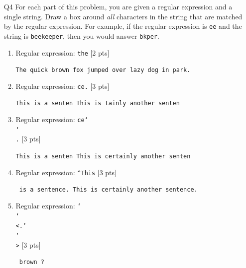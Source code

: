 \documentclass[12pt]{article}
\theoremstyle{Conjecture}
\theoremstyle{example}
\theoremstyle{remark}
\theoremstyle{lemma}
\theoremstyle{definition}
\theoremstyle{corol}
\theoremstyle{proposition}
\theoremstyle{condition}
\begin{document}
\begin{enumerate}
  \newpage

\item [Q4] For each part of this problem, you are given a regular expression and a single string. Draw a box around \emph{all} characters in the string that are matched by the regular expression. For example, if the regular expression is \texttt{ee} and the string is \texttt{beekeeper}, then you would answer \texttt{bkper}. 

\begin{enumerate}
  \item Regular expression: \texttt{\large the} [2 pts]
  \vspace{0.2in}
  \begin{center}
    \texttt{\large The quick brown fox jumped over  lazy dog in  park.}
  \end{center}
  \vspace{0.2in}
  \item Regular expression: \texttt{\large ce.} [3 pts]
  \vspace{0.2in}
  \begin{center}
    \texttt{\large This is a senten This is tainly another senten}
  \end{center}
  \vspace{0.2in}
  \item Regular expression: \texttt{\large ce\char`\\\char`\\.} [3 pts]
  \vspace{0.2in}
  \begin{center}
    \texttt{\large This is a senten This is certainly another senten}
  \end{center}
  \vspace{0.2in}
  \item Regular expression: \texttt{\large \textasciicircum This} [3 pts]
  \vspace{0.2in}
  \begin{center}
    \texttt{\large {} is a sentence. This is certainly another sentence.}
  \end{center}
  \vspace{0.2in}
  \item Regular expression: \texttt{\large \char`\\\char`\\<.\string{3\string}\char`\\\char`\\>} [3 pts]
  \vspace{0.2in}
  \begin{center}
    \texttt{\large {}  brown ?}
  \end{center}
\end{enumerate}
\newpage 


\end{enumerate}
\end{document}
